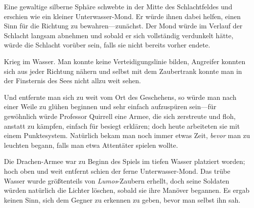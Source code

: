 Eine gewaltige silberne Sphäre schwebte in der Mitte des Schlachtfeldes und erschien wie ein kleiner Unterwasser-Mond. Er würde ihnen dabei helfen, einen Sinn für die Richtung zu bewahren—zunächst. Der Mond würde im Verlauf der Schlacht langsam abnehmen und sobald er sich vollständig verdunkelt hätte, würde die Schlacht vorüber sein, falls sie nicht bereits vorher endete.

Krieg im Wasser. Man konnte keine Verteidigungslinie bilden, Angreifer konnten sich aus jeder Richtung nähern und selbst mit dem Zaubertrank konnte man in der Finsternis des Sees nicht allzu weit sehen.

Und entfernte man sich zu weit vom Ort des Geschehens, so würde man nach einer Weile zu glühen beginnen und sehr einfach aufzuspüren sein—für gewöhnlich würde Professor Quirrell eine Armee, die sich zerstreute und floh, anstatt zu kämpfen, einfach für besiegt erklären; doch heute arbeiteten sie mit einem Punktesystem. Natürlich bekam man noch immer etwas Zeit, \emph{bevor} man zu leuchten begann, falls man etwa Attentäter spielen wollte.

Die Drachen-Armee war zu Beginn des Spiels im tiefen Wasser platziert worden; hoch oben und weit entfernt schien der ferne Unterwasser-Mond. Das trübe Wasser wurde größtenteils von \emph{Lumos}-Zaubern erhellt, doch seine Soldaten würden natürlich die Lichter löschen, sobald sie ihre Manöver begannen. Es ergab keinen Sinn, sich dem Gegner zu erkennen zu geben, bevor man selbst ihn sah.

